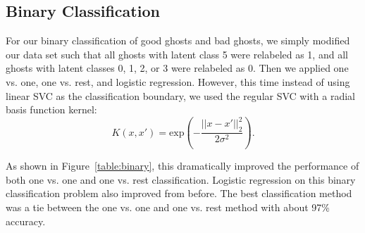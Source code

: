 \documentclass[11pt]{amsart}
\begin{document}
\subsection{Binary Classification}

For our binary classification of good ghosts and bad ghosts, we simply modified our data set such that all ghosts with latent class 5 were relabeled as 1, and all ghosts with latent classes 0, 1, 2, or 3 were relabeled as 0. Then we applied one vs. one, one vs. rest, and logistic regression. However, this time instead of using linear SVC as the classification boundary, we used the regular SVC with a radial basis function kernel:
$$ K(x,x') = \text{exp}\left(-\frac{|| x - x' ||_2^2}{2\sigma^2}\right).$$

As shown in Figure~\ref{table:binary}, this dramatically improved the performance of both one vs. one and one vs. rest classification. Logistic regression on this binary classification problem also improved from before. The best classification method was a tie between the one vs. one and one vs. rest method with about 97\% accuracy.
\end{document}
